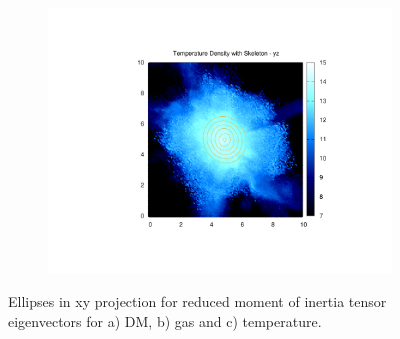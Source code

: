 \documentclass[journal]{IEEEtran}
\begin{document}
\begin{figure}[!t]
\begin{subfigure}[t]{0.3\textwidth}
		\includegraphics[width=\linewidth]{TempDenEllipyz}
	\end{subfigure}
\label{fig:ellipses}
\caption{Ellipses in xy projection for reduced moment of inertia tensor eigenvectors for a) DM, b) gas and c) temperature.}
\end{figure}
\end{document}
